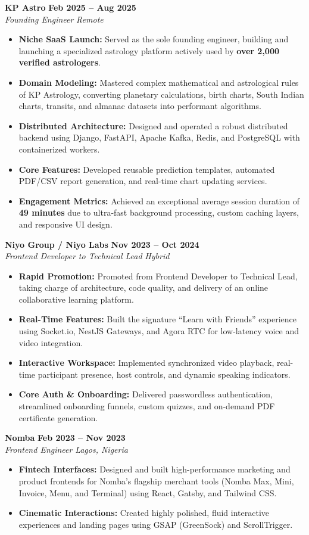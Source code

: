 \documentclass[10pt,a4paper]{article}
\newcommand{\jobheader}[4]{%
  \noindent%
  \textbf{\large #1} \hfill \textcolor{secondary}{\textbf{#2}} \\%
  \textit{\textcolor{accent}{#3}} \hfill \textit{\small\textcolor{secondary}{#4}}%
  \vspace{3pt}%
}
\begin{document}
\jobheader{KP Astro}{Feb 2025 -- Aug 2025}{Founding Engineer}{Remote}
\begin{itemize}
  \item \textbf{Niche SaaS Launch:} Served as the sole founding engineer, building and launching a specialized astrology platform actively used by \textbf{over 2,000 verified astrologers}.
  \item \textbf{Domain Modeling:} Mastered complex mathematical and astrological rules of KP Astrology, converting planetary calculations, birth charts, South Indian charts, transits, and almanac datasets into performant algorithms.
  \item \textbf{Distributed Architecture:} Designed and operated a robust distributed backend using Django, FastAPI, Apache Kafka, Redis, and PostgreSQL with containerized workers.
  \item \textbf{Core Features:} Developed reusable prediction templates, automated PDF/CSV report generation, and real-time chart updating services.
  \item \textbf{Engagement Metrics:} Achieved an exceptional average session duration of \textbf{49 minutes} due to ultra-fast background processing, custom caching layers, and responsive UI design.
\end{itemize}

\jobheader{Niyo Group / Niyo Labs}{Nov 2023 -- Oct 2024}{Frontend Developer to Technical Lead}{Hybrid}
\begin{itemize}
  \item \textbf{Rapid Promotion:} Promoted from Frontend Developer to Technical Lead, taking charge of architecture, code quality, and delivery of an online collaborative learning platform.
  \item \textbf{Real-Time Features:} Built the signature ``Learn with Friends'' experience using Socket.io, NestJS Gateways, and Agora RTC for low-latency voice and video integration.
  \item \textbf{Interactive Workspace:} Implemented synchronized video playback, real-time participant presence, host controls, and dynamic speaking indicators.
  \item \textbf{Core Auth \& Onboarding:} Delivered passwordless authentication, streamlined onboarding funnels, custom quizzes, and on-demand PDF certificate generation.
\end{itemize}

\jobheader{Nomba}{Feb 2023 -- Nov 2023}{Frontend Engineer}{Lagos, Nigeria}
\begin{itemize}
  \item \textbf{Fintech Interfaces:} Designed and built high-performance marketing and product frontends for Nomba's flagship merchant tools (Nomba Max, Mini, Invoice, Menu, and Terminal) using React, Gatsby, and Tailwind CSS.
  \item \textbf{Cinematic Interactions:} Created highly polished, fluid interactive experiences and landing pages using GSAP (GreenSock) and ScrollTrigger.
\end{itemize}
\end{document}

